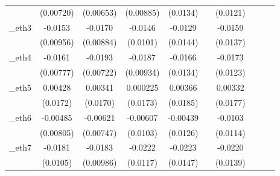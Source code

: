 \begin{table}[htbp]
\begin{tabular}{l*{9}{c}}
            &   (0.00720)         &   (0.00653)         &   (0.00885)         &    (0.0134)         &                     &    (0.0121)         &                     &                     &                     \\
[1em]
\_eth3       &     -0.0153         &     -0.0170\sym{*}  &     -0.0146         &     -0.0129         &                     &     -0.0159         &                     &                     &                     \\
            &   (0.00956)         &   (0.00884)         &    (0.0101)         &    (0.0144)         &                     &    (0.0137)         &                     &                     &                     \\
[1em]
\_eth4       &     -0.0161\sym{**} &     -0.0193\sym{***}&     -0.0187\sym{**} &     -0.0166         &                     &     -0.0173         &                     &                     &                     \\
            &   (0.00777)         &   (0.00722)         &   (0.00934)         &    (0.0134)         &                     &    (0.0123)         &                     &                     &                     \\
[1em]
\_eth5       &     0.00428         &     0.00341         &    0.000225         &     0.00366         &                     &     0.00332         &                     &                     &                     \\
            &    (0.0172)         &    (0.0170)         &    (0.0173)         &    (0.0185)         &                     &    (0.0177)         &                     &                     &                     \\
[1em]
\_eth6       &    -0.00485         &    -0.00621         &    -0.00607         &    -0.00439         &                     &     -0.0103         &                     &                     &                     \\
            &   (0.00805)         &   (0.00747)         &    (0.0103)         &    (0.0126)         &                     &    (0.0114)         &                     &                     &                     \\
[1em]
\_eth7       &     -0.0181\sym{*}  &     -0.0183\sym{*}  &     -0.0222\sym{*}  &     -0.0223         &                     &     -0.0220         &                     &                     &                     \\
            &    (0.0105)         &   (0.00986)         &    (0.0117)         &    (0.0147)         &                     &    (0.0139)         &                     &                     &                     \\

\end{tabular}
\end{table}
